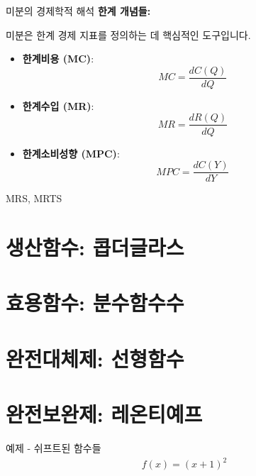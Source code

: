 \documentclass[aspectratio=169]{beamer}
\begin{document}
  
\begin{frame}{미분의 경제학적 해석}
  \textbf{한계 개념들:}
  
  미분은 한계 경제 지표를 정의하는 데 핵심적인 도구입니다.
  \bigskip
  \begin{itemize}
    \item \textbf{한계비용 (MC)}: 
    \[MC = \frac{dC(Q)}{dQ}\]
    \item \textbf{한계수입 (MR)}:
    \[MR = \frac{dR(Q)}{dQ}\]
    \item \textbf{한계소비성향 (MPC)}:
    \[MPC = \frac{dC(Y)}{dY}\]
  \end{itemize}
  MRS, MRTS 
\end{frame}



\section{생산함수: 콥더글라스}

\section{효용함수: 분수함수수}

\section{완전대체제: 선형함수}

\section{완전보완제: 레온티예프}




\begin{frame}{예제 - 쉬프트된 함수들}
  \begin{align*}
    f(x) = (x+1)^2
  \end{align*}
\end{frame}




\begin{frame}
  
\end{frame}
\end{document}
